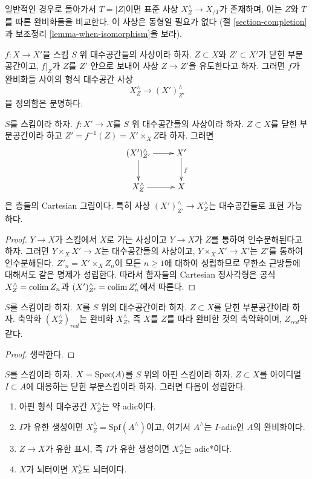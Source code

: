\medskip\noindent
일반적인 경우로 돌아가서 $T = |Z|$이면 표준 사상
$X^\wedge_Z \to X_{/T}$가 존재하며, 이는 $Z$와 $T$를 따른
완비화들을 비교한다. 이 사상은 동형일 필요가 없다
(절 \ref{section-completion}과 보조정리 \ref{lemma-when-isomorphism}을 보라).

\medskip\noindent
$f : X \to X'$을 스킴 $S$ 위 대수공간들의 사상이라 하자.
$Z \subset X$와 $Z' \subset X'$가 닫힌 부분공간이고,
$f|_Z$가 $Z$를 $Z'$ 안으로 보내어 사상 $Z \to Z'$을 유도한다고 하자.
그러면 $f$가 완비화들 사이의 형식 대수공간 사상
$$
X^\wedge_Z \longrightarrow (X')^\wedge_{Z'}
$$
을 정의함은 분명하다.

\begin{lemma}
\label{lemma-map-completions-subspaces-representable}
$S$를 스킴이라 하자. $f : X' \to X$를 $S$ 위 대수공간들의
사상이라 하자. $Z \subset X$를 닫힌 부분공간이라 하고
$Z' = f^{-1}(Z) = X' \times_X Z$라 하자. 그러면
$$
\xymatrix{
(X')^\wedge_{Z'} \ar[r] \ar[d] & X' \ar[d]^f \\
X^\wedge_Z \ar[r] & X
}
$$
은 층들의 Cartesian 그림이다. 특히 사상
$(X')^\wedge_{Z'} \to X^\wedge_Z$는 대수공간들로 표현 가능하다.
\end{lemma}

\begin{proof}
$Y \to X$가 스킴에서 $X$로 가는 사상이고 $Y \to X$가
$Z$를 통하여 인수분해된다고 하자. 그러면
$Y \times_X X' \to X$는 대수공간들의 사상이고,
$Y \times_X X' \to X'$는 $Z'$를 통하여 인수분해된다.
$Z'_n = X' \times_X Z_n$이 모든 $n \geq 1$에 대하여 성립하므로
무한소 근방들에 대해서도 같은 명제가 성립한다. 따라서 함자들의
Cartesian 정사각형은 공식 $X^\wedge_Z = \mathop{\mathrm{colim}}\nolimits Z_n$과
$(X')^\wedge_{Z'} = \mathop{\mathrm{colim}}\nolimits Z'_n$에서 따른다.
\end{proof}

\begin{lemma}
\label{lemma-reduction-completion-subspace}
$S$를 스킴이라 하자. $X$를 $S$ 위의 대수공간이라 하자.
$Z \subset X$를 닫힌 부분공간이라 하자. 축약화
$(X^\wedge_Z)_{red}$는 완비화 $X^\wedge_Z$, 즉 $X$를 $Z$를 따라
완비한 것의 축약화이며, $Z_{red}$와 같다.
\end{lemma}

\begin{proof}
생략한다.
\end{proof}

\begin{lemma}
\label{lemma-affine-formal-completion-subspace-types}
$S$를 스킴이라 하자. $X = \mathop{\mathrm{Spec}}(A)$를 $S$ 위의 아핀 스킴이라 하자.
$Z \subset X$를 아이디얼 $I \subset A$에 대응하는 닫힌 부분스킴이라 하자.
그러면 다음이 성립한다.
\begin{enumerate}
\item 아핀 형식 대수공간 $X^\wedge_Z$는 약 adic이다.
\item $I$가 유한 생성이면 $X^\wedge_Z = \text{Spf}(A^\wedge)$이고,
여기서 $A^\wedge$는 $I$-adic인 $A$의 완비화이다.
\item $Z \to X$가 유한 표시, 즉 $I$가 유한 생성이면
$X^\wedge_Z$는 adic*이다.
\item $X$가 뇌터이면 $X^\wedge_Z$도 뇌터이다.
\end{enumerate}
\end{lemma}


